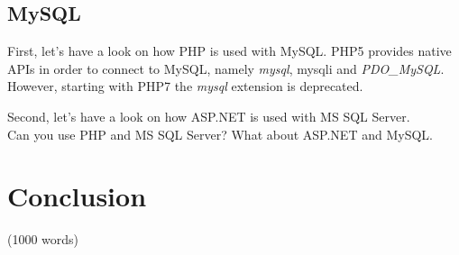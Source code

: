 \documentclass[11]{article}
\begin{document}
	\subsection{MySQL}
	First, let's have a look on how PHP is used with MySQL. PHP5 provides native APIs in order to connect to MySQL, namely \textit{mysql}, {mysqli}  and \textit{PDO\_MySQL}. However, starting with PHP7 the \textit{mysql} extension is deprecated.
	


	Second, let's have a look on how ASP.NET is used with MS SQL Server. \\

	Can you use PHP and MS SQL Server? What about ASP.NET and MySQL.

\section*{Conclusion}(1000 words)




\end{document}
